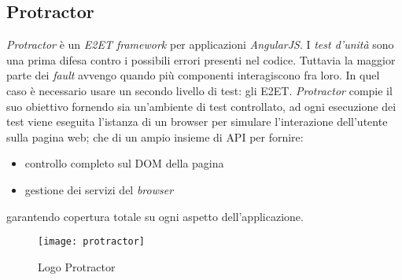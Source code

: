 \subsection{Protractor}
\textit{Protractor} è un \textit{\gls{E2ET} framework} per applicazioni
\textit{AngularJS}. I \textit{test d'unità} sono una prima difesa contro i
possibili errori presenti nel codice. Tuttavia la maggior parte dei
\textit{fault} avvengo quando più componenti interagiscono fra loro.
In quel caso è necessario usare un secondo livello di test: gli \gls{E2ET}.
\textit{Protractor} compie il suo obiettivo fornendo sia un'ambiente di test
controllato, ad ogni esecuzione dei test viene eseguita l'istanza di un browser
per simulare l'interazione dell'utente sulla pagina web; che di un ampio insieme
di \gls{API} per fornire:
\begin{itemize}
\item controllo completo sul \gls{DOM} della pagina
\item gestione dei servizi del \textit{browser}
\end{itemize}
garantendo copertura totale su ogni aspetto dell'applicazione.

\begin{figure}[H]
\begin{center}
\texttt{[image: protractor]}
\caption{Logo Protractor}
\label{fig:protractor_logo}
\end{center}
\end{figure}
